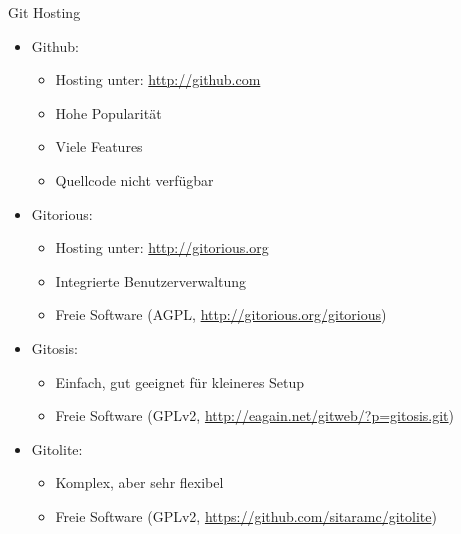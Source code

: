 \begin{frame}[allowframebreaks]{Git Hosting}
  \begin{itemize}
    \item Github:
    \begin{itemize}
      \item Hosting unter: \url{http://github.com}
      \item Hohe Popularität
      \item Viele Features
      \item Quellcode nicht verfügbar
    \end{itemize}
    \item Gitorious:
    \begin{itemize}
      \item Hosting unter: \url{http://gitorious.org}
      \item Integrierte Benutzerverwaltung
      \item Freie Software (AGPL, \url{http://gitorious.org/gitorious})
    \end{itemize}
  \framebreak
    \item Gitosis:
    \begin{itemize}
      \item Einfach, gut geeignet für kleineres Setup
      \item Freie Software (GPLv2, \url{http://eagain.net/gitweb/?p=gitosis.git})
    \end{itemize}
    \item Gitolite:
    \begin{itemize}
      \item Komplex, aber sehr flexibel 
      \item Freie Software (GPLv2, \url{https://github.com/sitaramc/gitolite})
    \end{itemize}
  \end{itemize}
\end{frame}

